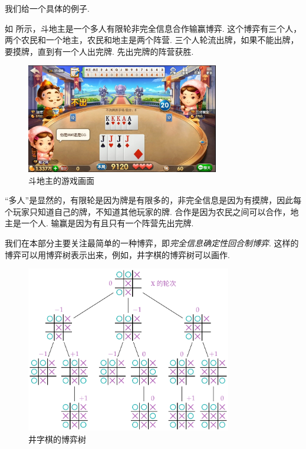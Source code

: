我们给一个具体的例子. 

\begin{example}
    如 所示，斗地主是一个多人有限轮非完全信息合作输赢博弈. 这个博弈有三个人，两个农民和一个地主，农民和地主是两个阵营. 三个人轮流出牌，如果不能出牌，要摸牌，直到有一个人出完牌. 先出完牌的阵营获胜. 

    \begin{figure}[ht]
        \centering
        \includegraphics[width=0.75\textwidth]{figures/game/fight-landlord.jpg}
        \caption{斗地主的游戏画面} \label{fig:fight-landlord}
    \end{figure}

    “多人”是显然的，有限轮是因为牌是有限多的，非完全信息是因为有摸牌，因此每个玩家只知道自己的牌，不知道其他玩家的牌. 合作是因为农民之间可以合作，地主是一个人. 输赢是因为有且只有一个阵营先出完牌. 
\end{example}

我们在本部分主要关注最简单的一种博弈，即\textit{完全信息确定性回合制博弈}. 这样的博弈可以用博弈树表示出来，例如，井字棋的博弈树可以画作.

\begin{figure}
    \centering
    \includegraphics[width=0.8\textwidth]{figures/game/game-tree.pdf}
    \caption{井字棋的博弈树}
    \label{fig:game-tree}
\end{figure}

